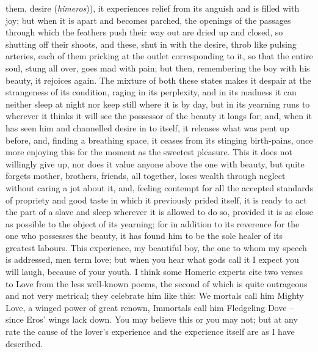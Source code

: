 them, desire
({\em himeros})), it
 experiences relief from its anguish and is filled with joy; but
when it is apart and becomes parched, the openings of the passages
through which the feathers push their way out are dried up and closed,
so shutting off their shoots, and these, shut  in with the
desire, throb like
pulsing arteries, each of them pricking at the outlet corresponding to
it, so that the entire soul, stung all over, goes mad with pain; but
then, remembering the boy with his
beauty, it rejoices
again. The mixture of both these states makes it despair at the
strangeness of its  condition, raging in its perplexity, and in
its madness it can neither sleep at night nor keep still where it is by
day, but in its yearning runs to wherever it thinks it will see the
possessor of the beauty it longs for; and, when it has seen him and
channelled desire in to
itself, it releases what was pent up before, and,  finding a
breathing space, it ceases from its stinging birth-pains, 
once more enjoying this for the moment as the sweetest pleasure. This it
does not willingly give up, nor does it value anyone above the one with
beauty, but quite forgets mother, brothers, friends, all together, loses
wealth through neglect without caring a jot about it, and, feeling
contempt for all the accepted  standards of propriety and good
taste in which it previously prided itself, it is ready to act the part
of a slave and sleep wherever it is allowed to do so, provided it is as
close as possible to the object of its yearning; for in addition to its
reverence for the one who possesses the beauty, it has found him to be
the  sole healer of its greatest labours. This experience, my
beautiful boy, the one to whom my speech is addressed, men term love;
but when you hear what gods call it I expect you will laugh, because of
your youth. I think some Homeric experts cite two  verses to
Love from the less well-known poems, the second of which is quite
outrageous and not very metrical; they celebrate him like this: We
mortals call him Mighty Love, a winged power of great renown, Immortals
call him Fledgeling Dove -- since Eros' wings lack
down. You may believe
this or you may not; but at any rate the cause  of the lover's
experience and the experience itself are as I have described.

